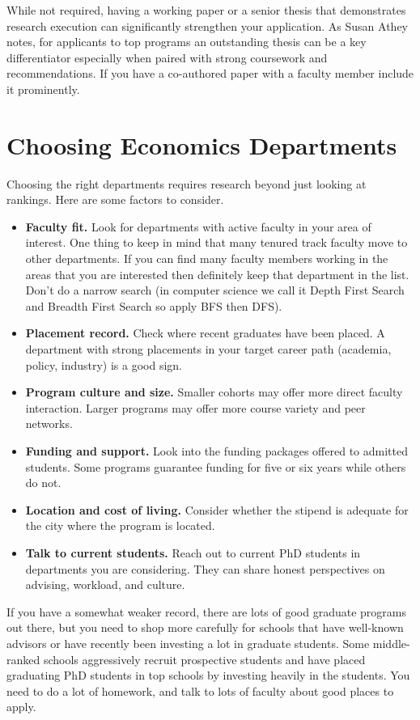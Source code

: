 \documentclass[11pt, letterpaper]{article}
\begin{document}
\begin{tipbox}
While not required, having a working paper or a senior thesis that demonstrates research execution can significantly strengthen your application. As Susan Athey notes, for applicants to top programs an outstanding thesis can be a key differentiator especially when paired with strong coursework and recommendations. If you have a co-authored paper with a faculty member include it prominently.
\end{tipbox}


\section{Choosing Economics Departments}\label{sec:departments}

Choosing the right departments requires research beyond just looking at rankings. Here are some factors to consider.
\begin{itemize}[leftmargin=*, itemsep=2pt]
    \item \textbf{Faculty fit.} Look for departments with active faculty in your area of interest. One thing to keep in mind that many tenured track faculty move to other departments. If you can find many faculty members working in the areas that you are interested then definitely keep that department in the list. Don't do a narrow search (in computer science we call it Depth First Search and Breadth First Search so apply BFS then DFS). 
    \item \textbf{Placement record.} Check where recent graduates have been placed. A department with strong placements in your target career path (academia, policy, industry) is a good sign.
    \item \textbf{Program culture and size.} Smaller cohorts may offer more direct faculty interaction. Larger programs may offer more course variety and peer networks.
    \item \textbf{Funding and support.} Look into the funding packages offered to admitted students. Some programs guarantee funding for five or six years while others do not.
    \item \textbf{Location and cost of living.} Consider whether the stipend is adequate for the city where the program is located.
    \item \textbf{Talk to current students.} Reach out to current PhD students in departments you are considering. They can share honest perspectives on advising, workload, and culture.
\end{itemize}
\begin{tipbox}
If you have a somewhat weaker record, there are lots of good graduate programs out there, but you need to shop more carefully for schools that have well-known advisors or have recently been investing a lot in graduate students. Some middle-ranked schools aggressively recruit prospective students and have placed graduating PhD students in top schools by investing heavily in the students. You need to do a lot of homework, and talk to lots of faculty about good places to apply. 
\end{tipbox}
\end{document}
